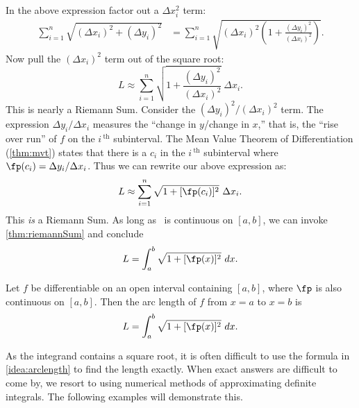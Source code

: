 In the above expression factor out a $\Delta x_i^2$ term:
\begin{align*}
	\sum_{i=1}^n \sqrt{(\Delta x_i)^2 + (\Delta y_i)^2}
	&= \sum_{i=1}^n \sqrt{(\Delta x_i)^2\left(1 + \frac{(\Delta y_i)^2}{(\Delta x_i)^2}\right)}.
\end{align*}
Now pull the $(\Delta x_i)^2$ term out of the square root:
\[L\approx\sum_{i=1}^n\sqrt{1 + \frac{(\Delta y_i)^2}{(\Delta x_i)^2}}\ \Delta x_i.\]
This is nearly a Riemann Sum. Consider the $(\Delta y_i)^2/(\Delta x_i)^2$ term. The expression $\Delta y_i/\Delta x_i$ measures the ``change in $y$/change in $x$,'' that is, the ``rise over run'' of $f$ on the $i\,^\text{th}$ subinterval. The Mean Value Theorem of Differentiation (\autoref{thm:mvt}) states that there is a $c_i$ in the $i\,^\text{th}$ subinterval where $\fp(c_i) = \Delta y_i/\Delta x_i$. Thus we can rewrite our above expression as:
\[L\approx\sum_{i=1}^n\sqrt{1+[\fp(c_i)]^2}\ \Delta x_i.\]
This \textit{is} a Riemann Sum. As long as \fp\ is continuous on $[a,b]$, we can invoke \autoref{thm:riemannSum} and conclude
\[L=\int_a^b\sqrt{1+[\fp(x)]^2}\ dx.\]

\begin{keyidea}\label{idea:arclength}
Let $f$ be differentiable on an open interval containing $[a,b]$, where $\fp$ is also continuous on $[a,b]$. Then the arc length of $f$ from $x=a$ to $x=b$ is
\[L = \int_a^b \sqrt{1+[\fp(x)]^2}\ dx.\]
\end{keyidea}


As the integrand contains a square root, it is often difficult to use the formula in \autoref{idea:arclength} to find the length exactly. When exact answers are difficult to come by, we resort to using numerical methods of approximating definite integrals. The following examples will demonstrate this.


